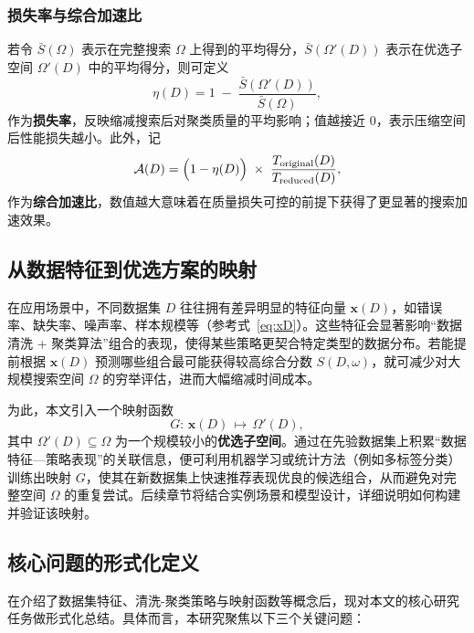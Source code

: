 \documentclass[10pt]{article} %
\numberwithin{equation}{section}
\begin{document}
\subsubsection*{损失率与综合加速比}
若令 \(\bar{S}(\Omega)\) 表示在完整搜索 \(\Omega\) 上得到的平均得分，\(\bar{S}(\Omega'(D))\) 表示在优选子空间 \(\Omega'(D)\) 中的平均得分，则可定义
\begin{equation}\label{eq:loss-rate}
  \eta(D)
  =
  1 \;-\;
  \frac{\bar{S}(\Omega'(D))}{\bar{S}(\Omega)},
\end{equation}
作为\textbf{损失率}，反映缩减搜索后对聚类质量的平均影响；值越接近 0，表示压缩空间后性能损失越小。此外，记
\begin{equation}\label{eq:acc-ratio}
  \mathcal{A}(D)
  =
  \Bigl(1 - \eta(D)\Bigr)
  \;\times\;
  \frac{T_{\text{original}}(D)}{T_{\text{reduced}}(D)},
\end{equation}
作为\textbf{综合加速比}，数值越大意味着在质量损失可控的前提下获得了更显著的搜索加速效果。

\subsection{从数据特征到优选方案的映射}
\label{subsec:mapping-model}

在应用场景中，不同数据集 \(D\) 往往拥有差异明显的特征向量 \(\mathbf{x}(D)\)，如错误率、缺失率、噪声率、样本规模等（参考式~\eqref{eq:xD}）。这些特征会显著影响“数据清洗 + 聚类算法”组合的表现，使得某些策略更契合特定类型的数据分布。若能提前根据 \(\mathbf{x}(D)\) 预测哪些组合最可能获得较高综合分数 \(S(D,\omega)\)，就可减少对大规模搜索空间 \(\Omega\) 的穷举评估，进而大幅缩减时间成本。

为此，本文引入一个映射函数
\begin{equation}\label{eq:Omega-prime}
  G:\, \mathbf{x}(D)\,\mapsto\, \Omega'(D),
\end{equation}
其中 \(\Omega'(D)\subseteq \Omega\) 为一个规模较小的\textbf{优选子空间}。通过在先验数据集上积累“数据特征—策略表现”的关联信息，便可利用机器学习或统计方法（例如多标签分类）训练出映射 \(G\)，使其在新数据集上快速推荐表现优良的候选组合，从而避免对完整空间 \(\Omega\) 的重复尝试。后续章节将结合实例场景和模型设计，详细说明如何构建并验证该映射。

\subsection{核心问题的形式化定义}
\label{subsec:problem-formalization}

在介绍了数据集特征、清洗-聚类策略与映射函数等概念后，现对本文的核心研究任务做形式化总结。具体而言，本研究聚焦以下三个关键问题：
\end{document}
